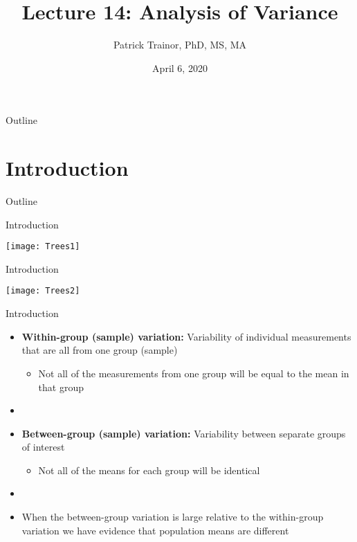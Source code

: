 \documentclass[xcolor=dvipsnames]{beamer}
\title[Lecture 14]{Lecture 14: Analysis of Variance}
\author[Patrick Trainor]{Patrick Trainor, PhD, MS, MA}
\institute[NMSU]{New Mexico State University}
\date{April 6, 2020}
\begin{document}
	
\begin{frame}
	\maketitle
\end{frame}

\begin{frame}{Outline}
	\tableofcontents[hideallsubsections]
\end{frame}

\section{Introduction}

\begin{frame}{Outline}
	\tableofcontents[currentsection,subsectionstyle=show/shaded/hide]
\end{frame}

\begin{frame}{Introduction}
	\begin{center}
		\texttt{[image: Trees1]}
	\end{center}
\end{frame}

\begin{frame}{Introduction}
	\begin{center}
		\texttt{[image: Trees2]}
	\end{center}
\end{frame}

\begin{frame}{Introduction}
	\begin{itemize}
		\item \textbf{Within-group (sample) variation:} Variability of individual measurements that are all from one group (sample) \pause
		\begin{itemize}
			\item Not all of the measurements from one group will be equal to the mean in that group \pause
		\end{itemize}
		\item[]
		\item \textbf{Between-group (sample) variation:} Variability between separate groups of interest \pause
		\begin{itemize}
			\item Not all of the means for each group will be identical \pause
		\end{itemize}
		\item[]
		\item When the between-group variation is large relative to the within-group variation we have evidence that population means are different 
	\end{itemize}
\end{frame}
\end{document}
